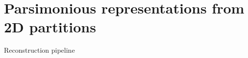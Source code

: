 \section{Parsimonious representations from 2D partitions}
\begin{frame}{Reconstruction pipeline}
	
\end{frame}

\begin{frame}
\end{frame}

\begin{frame}
\end{frame}
